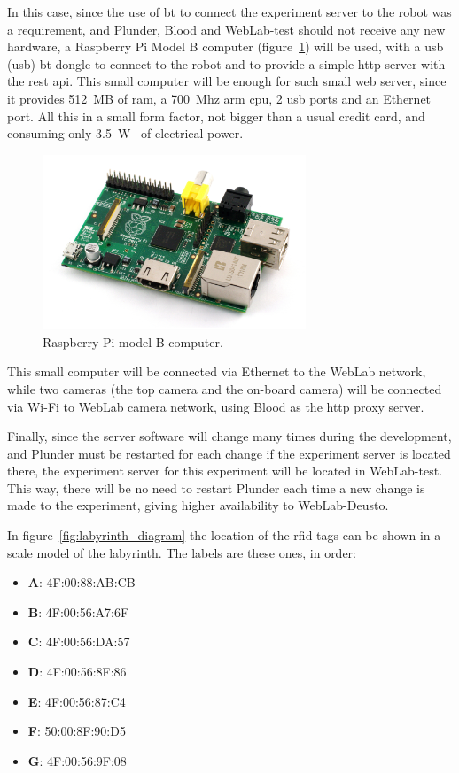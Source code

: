 In this case, since the use of \acrlong{bt} to connect the experiment server to the robot was a
requirement, and Plunder, Blood and WebLab-test should not receive any new hardware, a Raspberry Pi
Model B computer (figure~\ref{fig:rasp}) will be used, with a \acrshort{usb} (\acrlong{usb})
\acrlong{bt} dongle to connect to the robot and to provide a simple \acrshort{http} server with the
\acrshort{rest} \acrshort{api}. This small computer will be enough for such small web server, since
it provides 512~MB of \acrshort{ram}, a 700~Mhz \acrshort{arm} \acrshort{cpu}, 2 \acrshort{usb}
ports and an Ethernet port. All this in a small form factor, not bigger than a usual credit card,
and consuming only 3.5~W~\cite{rasp_b} of electrical power.

\begin{figure}[!htbp]
	\centering
	\includegraphics[width=0.7\textwidth]{fig/rasp.jpg}
	\caption{Raspberry Pi model B computer.}
	\label{fig:rasp}
\end{figure}

This small computer will be connected via Ethernet to the WebLab network, while two cameras (the top
camera and the on-board camera) will be connected via Wi-Fi to WebLab camera network, using Blood as
the \acrshort{http} proxy server.

Finally, since the server software will change many times during the development, and Plunder must
be restarted for each change if the experiment server is located there, the experiment server for
this experiment will be located in WebLab-test. This way, there will be no need to restart Plunder
each time a new change is made to the experiment, giving higher availability to WebLab-Deusto.

In figure~\ref{fig:labyrinth_diagram} the location of the \acrshort{rfid} tags can be shown in a
scale model of the labyrinth. The labels are these ones, in order:

\begin{itemize}
	\item \textbf{A}: 4F:00:88:AB:CB
	\item \textbf{B}: 4F:00:56:A7:6F
	\item \textbf{C}: 4F:00:56:DA:57
	\item \textbf{D}: 4F:00:56:8F:86
	\item \textbf{E}: 4F:00:56:87:C4
	\item \textbf{F}: 50:00:8F:90:D5
	\item \textbf{G}: 4F:00:56:9F:08
\end{itemize}

